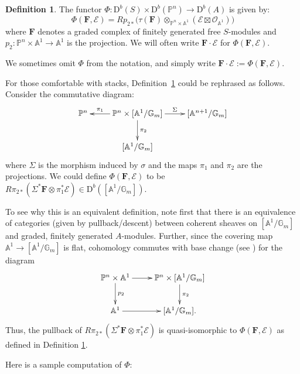 \documentclass[12pt]{amsart}
\theoremstyle{definition}
\newtheorem{defn}[lemma]{Definition}
\theoremstyle{remark}
\newcommand{\Spec}{\operatorname{Spec}}
\newcommand{\kk}{\Bbbk}
\newcommand{\PP}{\mathbb{P}}
\renewcommand{\AA}{\mathbb{A}}
\newcommand{\GG}{\mathbb{G}}
\newcommand{\cO}{\mathcal{O}}
\newcommand{\cE}{\mathcal{E}}
\newcommand{\FF}{\mathbf{F}}
\newcommand{\DD}{\mathrm{D}}
\renewcommand{\P}{{\mathbb P}}
\begin{document}
\begin{defn} \label{defn:product} The functor $\Phi: \DD^{b}(S)\times \DD^b(\PP^n) \to \DD^{b}(A)$ is given by:
$$
\Phi(\FF,\cE) = Rp_{2*} \bigl(\tau(\FF)\otimes_{\P^{n}\times\AA^{1}} (\cE\boxtimes \cO_{\AA^{1}}) \bigr)
$$
where $\FF$ denotes a graded  complex of finitely generated free $S$-modules and
$p_2: \PP^{n}\times \AA^{1}\to \AA^{1}$ is the projection. We will often write
$\FF\cdot \cE$ for $\Phi(\FF,\cE)$.
\end{defn}
We sometimes omit $\Phi$ from the notation, and simply write 
$\FF\cdot \cE:=\Phi(\FF,\cE)$.

For those comfortable with stacks, Definition~\ref{defn:product}
could be rephrased as follows. Consider the commutative diagram:
\[
\xymatrix{
\PP^n&\PP^{n}\times [\AA^1/\GG_m]\ar[l]_-{\pi_{1}} \ar[r]^-{\Sigma} \ar[d]^{\pi_2}&[\AA^{n+1}/\GG_m]\\
&[\AA^1/\GG_m]&%
}
\]
where $\Sigma$ is the morphism induced by $\sigma$ and the maps $\pi_1$ and $\pi_2$ are the projections.  We could define $\Phi(\FF,\cE)$ to be $R\pi_{2*}\left( \Sigma^*\FF\otimes \pi_{1}^{*}\cE\right)\in \DD^b([\AA^1/\GG_m])$.

To see why this is an equivalent definition, note first  that there is an equivalence of categories (given by pullback/descent) between coherent sheaves on $[\AA^1/\GG_m]$ and graded, finitely generated $A$-modules. Further, since the covering map $\AA^1\to [\AA^1/\GG_m]$ is flat, cohomology commutes with base change (see \cite[0765]{stacks-project}) for the diagram
\[
\xymatrix{
\PP^n\times \AA^1\ar[r]\ar[d]^-{p_2}&\PP^{n}\times [\AA^1/\GG_m]\ar[d]^{\pi_2}\\
\AA^1\ar[r]&[\AA^1/\GG_m].
}
\]
Thus, the pullback of $R\pi_{2*}\left( \Sigma^*\FF\otimes \pi_{1}^{*}\cE\right)$ is quasi-isomorphic 
to $\Phi(\FF,\cE)$ as defined in Definition \ref{defn:product}.

Here is a sample computation of $\Phi$: 
\end{document}
